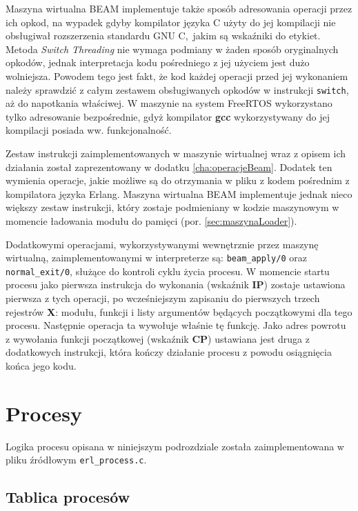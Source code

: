 Maszyna wirtualna BEAM implementuje także sposób adresowania operacji przez ich opkod, na wypadek gdyby kompilator języka C użyty do jej kompilacji nie obsługiwał rozszerzenia standardu GNU C,~jakim są wskaźniki do etykiet.
Metoda \emph{Switch Threading} nie wymaga podmiany w żaden sposób oryginalnych opkodów, jednak interpretacja kodu pośredniego z jej użyciem jest dużo wolniejsza.
Powodem tego jest fakt, że kod każdej operacji przed jej wykonaniem należy sprawdzić z całym zestawem obsługiwanych opkodów w instrukcji \texttt{switch}, aż do napotkania właściwej.
W maszynie na system FreeRTOS wykorzystano tylko adresowanie bezpośrednie, gdyż kompilator \textbf{gcc} wykorzystywany do jej kompilacji posiada ww. funkcjonalność.

Zestaw instrukcji zaimplementowanych w maszynie wirtualnej wraz z opisem ich działania został zaprezentowany w dodatku \ref{cha:operacjeBeam}.
Dodatek ten wymienia operacje, jakie możliwe są do otrzymania w pliku z kodem pośrednim z kompilatora języka Erlang.
Maszyna wirtualna BEAM implementuje jednak nieco większy zestaw instrukcji, który zostaje podmieniany w kodzie maszynowym w momencie ładowania modułu do pamięci (por. \ref{sec:maszynaLoader}).

Dodatkowymi operacjami, wykorzystywanymi wewnętrznie przez maszynę wirtualną, zaimplementowanymi w interpreterze są: \texttt{beam\_apply/0} oraz \texttt{normal\_exit/0}, służące do kontroli cyklu życia procesu.
W momencie startu procesu jako pierwsza instrukcja do wykonania (wskaźnik \textbf{IP}) zostaje ustawiona pierwsza z tych operacji, po wcześniejszym zapisaniu do pierwszych trzech rejestrów \textbf{X}: modułu, funkcji i listy argumentów będących początkowymi dla tego procesu.
Następnie operacja ta wywołuje właśnie tę funkcję.
Jako adres powrotu z wywołania funkcji początkowej (wskaźnik \textbf{CP}) ustawiana jest druga z dodatkowych instrukcji, która kończy działanie procesu z powodu osiągnięcia końca jego kodu.

\section{Procesy}
\label{sec:maszynaProcesy}

Logika procesu opisana w niniejszym podrozdziale została zaimplementowana w pliku źródłowym \texttt{erl\_process.c}.

\subsection{Tablica procesów}
\label{sub:procTablica}

